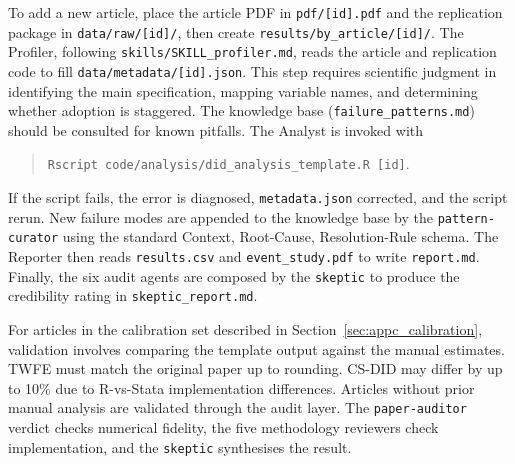 To add a new article, place the article PDF in \texttt{pdf/[id].pdf} and the replication package in \texttt{data/raw/[id]/}, then create \texttt{results/by\_article/[id]/}. The Profiler, following \texttt{skills/SKILL\_profiler.md}, reads the article and replication code to fill \texttt{data/metadata/[id].json}. This step requires scientific judgment in identifying the main specification, mapping variable names, and determining whether adoption is staggered. The knowledge base (\texttt{failure\_patterns.md}) should be consulted for known pitfalls. The Analyst is invoked with
\begin{quote}
\texttt{Rscript code/analysis/did\_analysis\_template.R [id]}.
\end{quote}
If the script fails, the error is diagnosed, \texttt{metadata.json} corrected, and the script rerun. New failure modes are appended to the knowledge base by the \texttt{pattern-curator} using the standard Context, Root-Cause, Resolution-Rule schema. The Reporter then reads \texttt{results.csv} and \texttt{event\_study.pdf} to write \texttt{report.md}. Finally, the six audit agents are composed by the \texttt{skeptic} to produce the credibility rating in \texttt{skeptic\_report.md}.

For articles in the calibration set described in Section~\ref{sec:appc_calibration}, validation involves comparing the template output against the manual estimates. TWFE must match the original paper up to rounding. CS-DID may differ by up to 10\% due to R-vs-Stata implementation differences. Articles without prior manual analysis are validated through the audit layer. The \texttt{paper-auditor} verdict checks numerical fidelity, the five methodology reviewers check implementation, and the \texttt{skeptic} synthesises the result.
